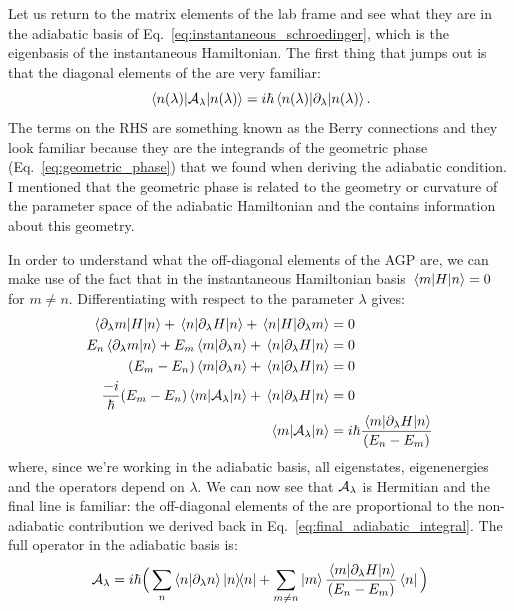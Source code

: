     Let us return to the matrix elements of the lab frame  and see what they are in the adiabatic basis of Eq.~\eqref{eq:instantaneous_schroedinger}, which is the eigenbasis of the instantaneous Hamiltonian. The first thing that jumps out is that the diagonal elements of the  are very familiar:
    \begin{equation}\label{eq:AGP_diagonal}
        \mel{n(\lambda)}{\mathcal{A}_{\lambda}}{n(\lambda)} = i\hbar \mel{n(\lambda)}{\partial_{\lambda}}{n(\lambda)}.
    \end{equation}
    The terms on the RHS are something known as the Berry connections and they look familiar because they are the integrands of the geometric phase (Eq.~\eqref{eq:geometric_phase}) that we found when deriving the adiabatic condition. I mentioned that the geometric phase is related to the geometry or curvature of the parameter space of the adiabatic Hamiltonian and the  contains information about this geometry. 

    In order to understand what the off-diagonal elements of the AGP are, we can make use of the fact that in the instantaneous Hamiltonian basis $\mel{m}{H}{n} = 0$ for $m \neq n$. Differentiating with respect to the parameter $\lambda$ gives:
    \begin{equation}\label{eq:differentiating_adiabatic_offdiagonals}
       \begin{aligned}
           \mel{\partial_{\lambda}m}{H}{n} + \mel{n}{\partial_{\lambda}H}{n} + \mel{n}{H}{\partial_{\lambda}m} &= 0 \\
           E_n \braket{\partial_{\lambda} m}{n} + E_m \braket{m}{\partial_{\lambda} n} + \mel{n}{\partial_{\lambda}H}{n} &= 0 \\
           (E_m - E_n) \braket{m}{\partial_{\lambda} n} + \mel{n}{\partial_{\lambda}H}{n} &= 0 \\
           \frac{-i}{\hbar} (E_m - E_n) \mel{m}{\mathcal{A}_{\lambda}}{n} + \mel{n}{\partial_{\lambda}H}{n} &= 0 \\
           \mel{m}{\mathcal{A}_{\lambda}}{n} &= i\hbar \frac{\mel{m}{\partial_{\lambda}H}{n}}{(E_n - E_m)}
       \end{aligned} 
    \end{equation}
    where, since we're working in the adiabatic basis, all eigenstates, eigenenergies and the operators depend on $\lambda$. We can now see that $\mathcal{A}_{\lambda}$ is Hermitian and the final line is familiar: the off-diagonal elements of the  are proportional to the non-adiabatic contribution we derived back in Eq.~\eqref{eq:final_adiabatic_integral}. The full operator in the adiabatic basis is:
    \begin{equation}\label{eq:AGP_adiabatic_basis}
        \AGP{\lambda} = i\hbar\Big(\sum_n \braket{n}{\dlambda n} \dyad{n} + \sum_{m \neq n} \ket{m} \frac{\mel{m}{\dlambda H}{n}}{(E_n - E_m)} \bra{n} \Big)
    \end{equation}

